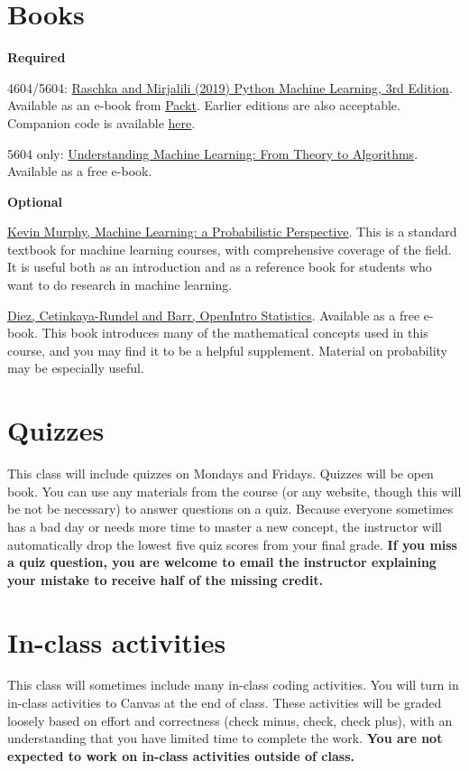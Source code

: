 \documentclass[10pt]{memoir}
\begin{document}
\section{\textbf{Books}}

\textbf{Required}

4604/5604: \href{https://sebastianraschka.com/books.html}{Raschka and Mirjalili (2019) Python Machine Learning, 3rd Edition}. Available as an e-book from \href{https://www.packtpub.com/data/python-machine-learning-third-edition}{Packt}. Earlier editions are also acceptable. Companion code is available \href{https://github.com/rasbt/python-machine-learning-book-3rd-edition}{here}.
 
5604 only: \href{https://www.cs.huji.ac.il/~shais/UnderstandingMachineLearning/copy.html}{Understanding Machine Learning: From Theory to Algorithms}. Available as a free e-book.

\textbf{Optional}

\href{https://www.cs.ubc.ca/~murphyk/MLbook/}{Kevin Murphy, Machine Learning: a Probabilistic Perspective}. This is a standard textbook for machine learning courses, with comprehensive coverage of the field. It is useful both as an introduction and as a reference book for students who want to do research in machine learning.

\href{https://www.abehandler.com/resources/openintro-statistics.pdf}{Diez, Cetinkaya-Rundel and Barr, OpenIntro Statistics}. Available as a free e-book. This book introduces many of the mathematical concepts used in this course, and you may find it to be a helpful supplement. Material on probability may be especially useful.

\section{\textbf{Quizzes}}

This class will include quizzes on Mondays and Fridays.
Quizzes will be open book.
You can use any materials from the course (or any website, though this will be not be necessary) to answer questions on a quiz. 
Because everyone sometimes has a bad day or needs more time to master a new concept, the instructor will automatically drop the lowest five quiz scores from your final grade.
\textbf{If you miss a quiz question, you are welcome to email the instructor explaining your mistake to receive half of the missing credit.}

\section{\textbf{In-class activities}}
This class will sometimes include many in-class coding activities.
You will turn in in-class activities to Canvas at the end of class.
These activities will be graded loosely based on effort and correctness (check minus, check, check plus), with an understanding that you have limited time to complete the work.
\textbf{You are not expected to work on in-class activities outside of class.}
\end{document}
